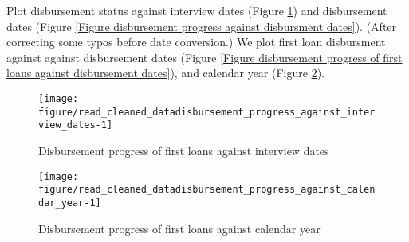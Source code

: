 Plot disbursement status against interview dates (\textsf{\small Figure \ref{Figure disbursement progress against interview dates}}) and disbursement dates (\textsf{\small Figure \ref{Figure disbursement progress against disbursment dates}}). (After correcting some typos before date conversion.) %
We plot first loan disbursment against against disbursement dates (\textsf{\small Figure \ref{Figure disbursement progress of first loans against disbursement dates}}), and calendar year (\textsf{\small Figure \ref{Figure disbursement progress against calendar year}}).
\begin{Schunk}
\begin{figure}

{\centering \texttt{[image: figure/read\_cleaned\_datadisbursement\_progress\_against\_interview\_dates-1]} 

}

\caption[Disbursement progress of first loans against interview dates]{Disbursement progress of first loans against interview dates}\label{Figure disbursement progress against interview dates}
\end{figure}
\end{Schunk}
\begin{Schunk}
\begin{figure}

{\centering \texttt{[image: figure/read\_cleaned\_datadisbursement\_progress\_against\_calendar\_year-1]} 

}

\caption[Disbursement progress of first loans against calendar year]{Disbursement progress of first loans against calendar year}\label{Figure disbursement progress against calendar year}
\end{figure}
\end{Schunk}
